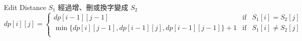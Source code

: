 \begin{itemize}

\item[Edit Distance] $S_1$ 經過增、刪或換字變成 $S_2$
    $dp[i][j] = \left \{
        \begin{array}{lrc}
            dp[i-1][j-1] & \mbox{if} & S_1[i] = S_2[j] \\
            \min\{ dp[i][j-1], dp[i-1][j], dp[i-1][j-1]\}+1 & \mbox{if} & S_1[i] \neq S_2[j] \\
        \end{array}\right .$
    
\end{itemize}
